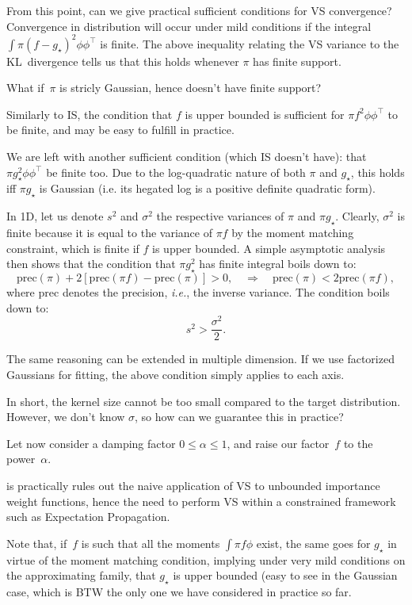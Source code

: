 \documentclass{article}
\def\prec{\mathrm{prec}}
\begin{document}
From this point, can we give practical sufficient conditions for VS convergence?  Convergence in distribution will occur under mild conditions if the integral $\int \pi (f-g_\star)^2\phi\phi^\top$ is finite. The above inequality relating the VS variance to the KL~divergence tells us that this holds whenever $\pi$ has finite support.

What if~$\pi$ is stricly Gaussian, hence doesn't have finite support? 

Similarly to IS, the condition that $f$ is upper bounded is sufficient for $\pi f^2 \phi\phi^\top$ to be finite, and may be easy to fulfill in practice.

We are left with another sufficient condition (which IS doesn't have): that $\pi g_\star^2 \phi\phi^\top$ be finite too. Due to the log-quadratic nature of both $\pi$ and $g_\star$, this holds iff $\pi g_\star$ is Gaussian (i.e. its hegated log is a positive definite quadratic form).

In 1D, let us denote $s^2$ and $\sigma^2$ the respective variances of $\pi$ and $\pi g_\star$. Clearly, $\sigma^2$ is finite because it is equal to the variance of $\pi f$ by the moment matching constraint, which is finite if $f$ is upper bounded. A simple asymptotic analysis then shows that the condition that $\pi g_\star^2$ has finite integral boils down to:
$$
\prec(\pi) + 2 [\prec(\pi f) - \prec(\pi)] > 0,
\quad \Rightarrow \quad
\prec(\pi) < 2 \prec(\pi f),
$$
where $\prec$ denotes the precision, {\em i.e.}, the inverse variance. The condition boils down to:
$$
s^2 > \frac{\sigma^2}{2}.
$$

The same reasoning can be extended in multiple dimension. If we use factorized Gaussians for fitting, the above condition simply applies to each axis.

In short, the kernel size cannot be too small compared to the target distribution. However, we don't know $\sigma$, so how can we guarantee this in practice? 

Let now consider a damping factor $0\leq \alpha \leq 1$, and raise our factor~$f$ to the power~$\alpha$. 


is practically rules out the naive application of VS to unbounded importance weight functions, hence the need to perform VS within a constrained framework such as Expectation Propagation.



Note that, if~$f$ is such that all the moments $\int\pi f \phi$ exist, the same goes for $g_\star$ in virtue of the moment matching condition, implying under very mild conditions on the approximating family, that $g_\star$ is upper bounded (easy to see in the Gaussian case, which is BTW the only one we have considered in practice so far.
\end{document}
